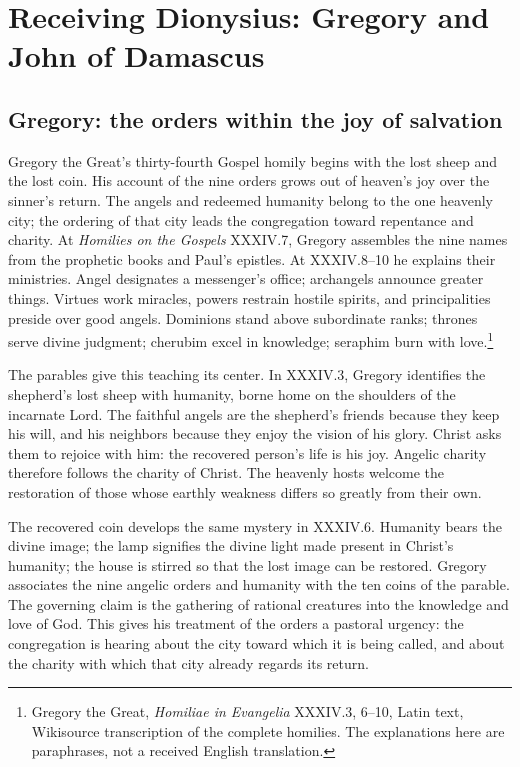 \section{Receiving Dionysius: Gregory and John of Damascus}
\label{sec:reception}

\subsection{Gregory: the orders within the joy of salvation}

Gregory the Great's thirty-fourth Gospel homily begins with the lost sheep and the lost coin. His account of the nine orders grows out of heaven's joy over the sinner's return. The angels and redeemed humanity belong to the one heavenly city; the ordering of that city leads the congregation toward repentance and charity. At \emph{Homilies on the Gospels} XXXIV.7, Gregory assembles the nine names from the prophetic books and Paul's epistles. At XXXIV.8--10 he explains their ministries. Angel designates a messenger's office; archangels announce greater things. Virtues work miracles, powers restrain hostile spirits, and principalities preside over good angels. Dominions stand above subordinate ranks; thrones serve divine judgment; cherubim excel in knowledge; seraphim burn with love.\footnote{Gregory the Great, \emph{Homiliae in Evangelia} XXXIV.3, 6--10, Latin text, Wikisource transcription of the complete homilies. The explanations here are paraphrases, not a received English translation.}


The parables give this teaching its center. In XXXIV.3, Gregory identifies the shepherd's lost sheep with humanity, borne home on the shoulders of the incarnate Lord. The faithful angels are the shepherd's friends because they keep his will, and his neighbors because they enjoy the vision of his glory. Christ asks them to rejoice with him: the recovered person's life is his joy. Angelic charity therefore follows the charity of Christ. The heavenly hosts welcome the restoration of those whose earthly weakness differs so greatly from their own.

The recovered coin develops the same mystery in XXXIV.6. Humanity bears the divine image; the lamp signifies the divine light made present in Christ's humanity; the house is stirred so that the lost image can be restored. Gregory associates the nine angelic orders and humanity with the ten coins of the parable. The governing claim is the gathering of rational creatures into the knowledge and love of God. This gives his treatment of the orders a pastoral urgency: the congregation is hearing about the city toward which it is being called, and about the charity with which that city already regards its return.

